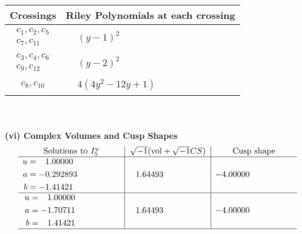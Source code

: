 \documentclass[1p]{elsarticle_modified}
\theoremstyle{definition}
\newcommand{\I}{\sqrt{-1}}
\begin{document}
\begin{tabular}{m{50pt}|m{274pt}}
Crossings & \hspace{64pt}Riley Polynomials at each crossing \\
\hline $$\begin{aligned}c_{1},c_{2},c_{5}\\c_{7},c_{11}\end{aligned}$$&$\begin{aligned}
&(y-1)^2
\end{aligned}$\\
\hline $$\begin{aligned}c_{3},c_{4},c_{6}\\c_{9},c_{12}\end{aligned}$$&$\begin{aligned}
&(y-2)^2
\end{aligned}$\\
\hline $$\begin{aligned}c_{8},c_{10}\end{aligned}$$&$\begin{aligned}
&4(4 y^2-12 y+1)
\end{aligned}$\\
\hline
\end{tabular}\\~\\
\newpage\flushleft \textbf{(vi) Complex Volumes and Cusp Shapes}
$$\begin{array}{c|c|c}  
\text{Solutions to }I^u_{5}& \I (\text{vol} + \sqrt{-1}CS) & \text{Cusp shape}\\
 \hline 
\begin{aligned}
u &= \phantom{-}1.00000\phantom{ +0.000000I} \\
a &= -0.292893\phantom{ +0.000000I} \\
b &= -1.41421\phantom{ +0.000000I}\end{aligned}
 & \phantom{-}1.64493\phantom{ +0.000000I} & -4.00000\phantom{ +0.000000I} \\ \hline\begin{aligned}
u &= \phantom{-}1.00000\phantom{ +0.000000I} \\
a &= -1.70711\phantom{ +0.000000I} \\
b &= \phantom{-}1.41421\phantom{ +0.000000I}\end{aligned}
 & \phantom{-}1.64493\phantom{ +0.000000I} & -4.00000\phantom{ +0.000000I}\\
 \hline 
 \end{array}$$\newpage
\newpage\renewcommand{\arraystretch}{1}
\end{document}
